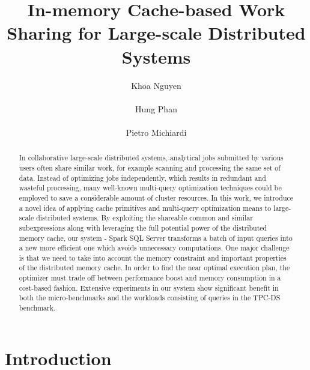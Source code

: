 \documentclass{acmsig}
\begin{document}
\title{In-memory Cache-based Work Sharing for Large-scale Distributed Systems}


\author{
\alignauthor
Khoa Nguyen\\
       \\
\alignauthor
Hung Phan\\
       \\
\alignauthor 
Pietro Michiardi
       \\
}
\maketitle

\begin{abstract}
In collaborative large-scale distributed systems, analytical jobs submitted by various users often share similar work, for example scanning and processing the same set of data. Instead of optimizing jobs independently, which results in redundant and wasteful processing, many well-known multi-query optimization techniques could be employed to save a considerable amount of cluster resources. In this work, we introduce a novel idea of applying cache primitives and multi-query optimization means to large-scale distributed systems. By exploiting the shareable common and similar subexpressions along with leveraging the full potential power of the distributed memory cache, our system - Spark SQL Server transforms a batch of input queries into a new more efficient one which avoids unnecessary computations. One major challenge is that we need to take into account the memory constraint and important properties of the distributed memory cache. In order to find the near optimal execution plan, the optimizer must trade off between performance boost and memory consumption in a cost-based fashion. Extensive experiments in our system show significant benefit in both the micro-benchmarks and the workloads consisting of queries in the TPC-DS benchmark.
\end{abstract}

\section{Introduction}
\label{sec:introduction}

\end{document}
